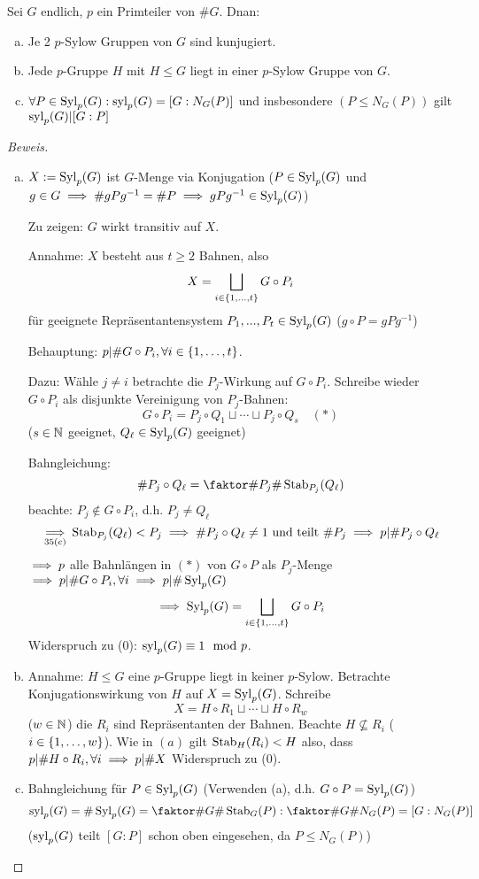 \documentclass[a4paper]{report}
\begin{document}
\begin{satz}
  Sei $G$ endlich, $p$ ein Primteiler von $\#G$. Dnan:
  \begin{enumerate}[(a)]
    \item Je 2 $p$-Sylow Gruppen von $G$ sind kunjugiert.
    \item Jede $p$-Gruppe $H$ mit $H \le G$ liegt in einer $p$-Sylow Gruppe von $G$.
    \item $\forall P \in \operatorname{Syl}_{p}(G): \operatorname{syl}_{p}(G) = [G : N_{G}(P)]$ und insbesondere $(P \le N_{G}(P))$ gilt $\operatorname{syl}_{p}(G) | [G : P]$
  \end{enumerate}
  \begin{proof}[Beweis]
    \begin{enumerate}[(a)]
      \item $X:= \operatorname{Syl}_{p}(G)$ ist $G$-Menge via Konjugation ($P \in \operatorname{Syl}_{p}(G)$ und $g \in G \implies \#gPg^{-1} = \#P \implies gPg^{-1} \in \operatorname{Syl}_{p}(G)$)

      Zu zeigen: $G$ wirkt transitiv auf $X$.

      Annahme: $X$ besteht aus $t \ge 2$ Bahnen, also \[X = \bigsqcup_{i \in \{1, \ldots, t\}} G \circ P_{i}\]
      für geeignete Repräsentantensystem $P_{1}, ..., P_{t} \in \operatorname{Syl}_{p}(G)$ ($g \circ P = gPg^{-1}$)

      Behauptung: $p | \#G \circ P_{i}, \forall i \in \{1, \ldots, t\}$.

      Dazu: Wähle $j \ne i$ betrachte die $P_{j}$-Wirkung auf $G \circ P_{i}$. Schreibe wieder $G \circ P_{i}$ als disjunkte Vereinigung von $P_{j}$-Bahnen:
      \[G \circ P_{i} = P_{j} \circ Q_{1} \sqcup \cdots \sqcup P_{j}\circ Q_{s} \quad (*)\]
      ($s \in \mathbb{N}$ geeignet, $Q_{\ell} \in \operatorname{Syl}_{p}(G)$ geeignet)

      Bahngleichung:
      \[\#P_{j}\circ Q_{\ell} = \fak{\#P_{j}}{\#\stb_{P_{j}}(Q_{\ell})}\]
      beachte: $P_{j} \notin G \circ P_{i}$, d.h. $P_{j} \ne Q_{\ell}$
      \[\underset{35(c)} {\implies} \operatorname{Stab}_{P_{j}}(Q_{\ell}) < P_{j} \implies \#P_{j} \circ Q_{\ell} \ne 1 \text{ und teilt } \#P_{j} \implies p | \#P_{j}\circ Q_{\ell}\]
      $\implies p$ alle Bahnlängen in $(*)$ von $G \circ P$ als $P_{j}$-Menge $\implies p | \#G \circ P_{i}, \forall i \implies p | \#\operatorname{Syl}_{p}(G)$
      \[\implies \operatorname{Syl}_{p}(G) = \bigsqcup_{i \in \{1, \ldots, t\}}G \circ P_{i}\]
      Widerspruch zu (0): $\operatorname{syl}_{p}(G) \equiv 1 \mod p$.
      \item Annahme: $H \le G$ eine $p$-Gruppe liegt in keiner $p$-Sylow. Betrachte Konjugationswirkung von $H$ auf $X = \operatorname{Syl}_{p}(G)$. Schreibe
            \[X= H \circ R_{1} \sqcup \cdots \sqcup H \circ R_{w}\]
            ($w \in \mathbb{N}$) die $R_{i}$ sind Repräsentanten der Bahnen. Beachte $H \nsubseteq R_{i}$ ($i \in \{1, \ldots, w\}$). Wie in $(a)$ gilt $\operatorname{Stab}_{H}(R_{i}) < H$ also, dass $p | \#H \circ R_{i}, \forall i \implies p | \#X$ Widerspruch zu (0).
      \item Bahngleichung für $P \in \operatorname{Syl}_{p}(G)$
            (Verwenden (a), d.h. $G \circ P = \operatorname{Syl}_{p}(G)$)
            \[\syl_{p}(G)=\#\Syl_{p}(G) = \fak {\#G}{\#\stb_{G}(P)} : \fak {\#G}{\#N_{G}(P)} = [G : N_{G}(P)]\]
            ($\operatorname{syl}_{p}(G)$ teilt $[G: P]$ schon oben eingesehen, da $P \le N_{G}(P)$)
    \end{enumerate}


\end{proof}
\end{satz}
\end{document}
